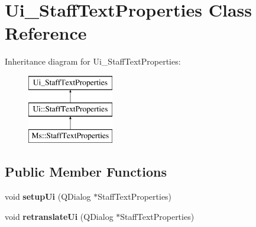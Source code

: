 \hypertarget{class_ui___staff_text_properties}{}\section{Ui\+\_\+\+Staff\+Text\+Properties Class Reference}
\label{class_ui___staff_text_properties}
Inheritance diagram for Ui\+\_\+\+Staff\+Text\+Properties\+:\begin{figure}[H]
\begin{center}
\leavevmode
\includegraphics[height=3.000000cm]{class_ui___staff_text_properties}
\end{center}
\end{figure}
\subsection*{Public Member Functions}
\begin{DoxyCompactItemize}
\item 
\mbox{\label{class_ui___staff_text_properties_a7ccd0ba0aeab5f9b82b029c71471d8ac}} 
void {\bfseries setup\+Ui} (Q\+Dialog $\ast$Staff\+Text\+Properties)
\item 
\mbox{\label{class_ui___staff_text_properties_a761f8a2c902bbfc7b9916fba017f6f70}} 
void {\bfseries retranslate\+Ui} (Q\+Dialog $\ast$Staff\+Text\+Properties)
\end{DoxyCompactItemize}
